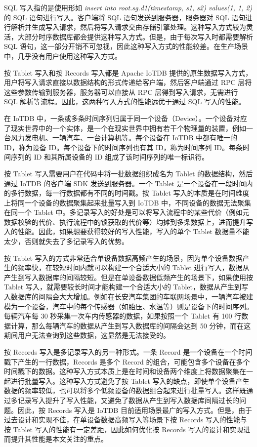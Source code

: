 SQL 写入指的是使用形如 \emph{insert into root.sg.d1(timestamp, s1, s2) values(1, 1, 2)} 的 SQL 语句进行写入。客户端将 SQL 语句发送到服务器，服务器对 SQL 语句进行解析并生成写入请求，然后将写入请求交由存储引擎处理。这种写入方式较为灵活，大部分时序数据库都会提供这种写入方式。但是，由于每次写入时都需要解析 SQL 语句，这一部分开销不可忽视，因此这种写入方式的性能较差。在生产场景中，几乎没有用户使用这种写入方式。

按 Tablet 写入和按 Records 写入都是 Apache IoTDB 提供的原生数据写入方式，用户将写入请求直接以数据结构的形式传递给客户端，然后客户端通过 RPC 层将这些参数传输到服务器，服务器可以直接从 RPC 层得到写入请求，无需进行 SQL 解析等流程。因此，这两种写入方式的性能远优于通过 SQL 写入的性能。

在 IoTDB 中，一条或多条时间序列归属于同一个设备（Device）\cite{apache2024iotdbdevice}。一个设备对应了现实世界中的一个实体，是一个在现实世界中拥有若干个物理量的装置，例如一台风力发电机、一辆汽车、一台计算机等。每个设备在 IoTDB 中都有唯一的 ID，称为设备 ID。每个设备下的时间序列也有其 ID，称为时间序列 ID。每条时间序列的 ID 和其所属设备的 ID 组成了该时间序列的唯一标识符。

按 Tablet 写入需要用户在代码中将一批数据组织成名为 Tablet 的数据结构，然后通过 IoTDB 的客户端 SDK 发送到服务器。一个 Tablet 是一个设备在一段时间内的多行数据，每一行数据都有不同的时间戳。按 Tablet 写入的本质是在时间维度上将同一个设备的数据聚集起来批量写入到 IoTDB 中，不同设备的数据无法聚集在同一个 Tablet 中。多记录写入的好处是可以将写入流程中的某些代价（例如元数据校验的代价、执行流程中的锁获取的代价等）均摊到多条数据上，进而提升写入的性能。因此，如果想要获得较好的写入性能，写入的单个 Tablet 数据量不能太少，否则就失去了多记录写入的优势。

按 Tablet 写入的方式非常适合单设备数据高频产生的场景，因为单个设备数据产生的频率快，在较短时间内就可以构建一个合适大小的 Tablet 进行写入，数据从产生到写入数据库的间隔较短。但是在单设备数据低频产生的场景下，如果使用按 Tablet 写入，就需要较长时间才能构建一个合适大小的 Tablet，数据从产生到写入数据库的间隔会大大增加。例如在长安汽车集团的车联网场景中，一辆汽车被建模为一个设备，汽车中的每个传感器（如胎压、水温等）则是设备下的时间序列。每辆汽车每 30 秒采集一次车内传感器的数据，如果按照一个 Tablet 有 100 行数据计算，那么每辆汽车的数据从产生到写入数据库的间隔会达到 50 分钟，而在这期间用户无法查询到这些数据，这显然是无法接受的。

按 Records 写入是多记录写入的另一种形式。一条 Record 是一个设备在一个时间戳下产生的一行数据，Records 是多个 Record 的组合，可能包含多个设备在多个时间戳下的数据。这种写入方式本质上是在时间和设备两个维度上将数据聚集在一起进行批量写入。这种写入方式避免了按 Tablet 写入的缺点，即使单个设备产生数据的频率较低，也可以将多个低频设备的数据组合起来进行批量写入。这样既通过多记录写入提升了写入性能，又避免了数据从产生到写入数据库间隔过长的问题。因此，按 Records 写入是 IoTDB 目前适用场景最广的写入方式。但是，由于过去设计和实现不佳，在单设备数据高频写入等场景下按 Records 写入的性能与按 Tablet 写入的性能有一定差距，因此如何优化按 Records 写入的设计和实现进而提升其性能是本文关注的重点。

